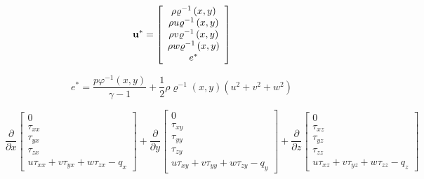 \documentclass{article}
\begin{document}
\begin{equation} {\bf u}^* = \left[\begin{array}{c} \rho \varrho^{-1}\left(x,y\right) \\ \rho u \varrho^{-1}\left(x,y\right) \\ \rho v \varrho^{-1}\left(x,y\right) \\ \rho w \varrho^{-1}\left(x,y\right) \\ e^* \end{array}\right] \end{equation}
\pagebreak

\begin{equation} e^* = \frac{p \varphi^{-1}\left(x,y\right)}{\gamma-1} + \frac{1}{2}\rho \varrho^{-1}\left(x,y\right) \left(u^2+v^2+w^2\right) \end{equation}
\pagebreak

\begin{equation} \frac {\partial} {\partial x} \left[\begin{array}{c} 0 \\ \tau_{xx} \\ \tau_{yx} \\ \tau_{zx} \\ u \tau_{xx} + v \tau_{yx} + w \tau_{zx} - q_x \end{array}\right] + \frac {\partial} {\partial y} \left[\begin{array}{c} 0 \\ \tau_{xy} \\ \tau_{yy} \\ \tau_{zy} \\ u \tau_{xy} + v \tau_{yy} + w \tau_{zy} - q_y \end{array}\right] + \frac {\partial} {\partial z} \left[\begin{array}{c} 0 \\ \tau_{xz} \\ \tau_{yz} \\ \tau_{zz} \\ u \tau_{xz} + v \tau_{yz} + w \tau_{zz} - q_z \end{array}\right] \end{equation}
\pagebreak
\end{document}
